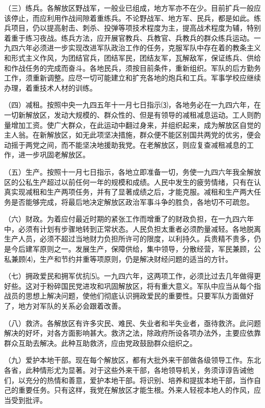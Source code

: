 \documentclass[UTF-8, a5paper, 12pt]{ctexart}
\begin{document}
（三）练兵。各解放区野战军，一般业已组成，地方军亦不在少。目前扩兵一般应该停止，而应利用作战间隙着重练兵。不论野战军、地方军、民兵，都是如此。练兵项目，仍以提高射击、刺杀、投弹等项技术程度为主，提高战术程度为辅，特别着重于练习夜战。练兵方法，应开展官教兵、兵教官、兵教兵的群众练兵运动。一九四六年必须进一步实现改进军队政治工作的任务，克服军队中存在着的教条主义和形式主义作风，为团结官兵，团结军民，团结友军，瓦解敌军，保证练兵、供给和作战任务的完成而奋斗。各地民兵，须按目前条件，重新组织。军队的后方勤务工作，须重新调整。应尽一切可能建立和扩充各地的炮兵和工兵。军事学校应继续办理，着重技术人材的训练。

（四）减租。按照中央一九四五年十一月七日指示⑶，各地务必在一九四六年，在一切新解放区，发动大规模的、群众性的、但是有领导的减租减息运动。工人则酌量增加工资。使广大群众，在此运动中翻过身来，并组织起来，成为解放区自觉的主人翁。在新解放区，如无此项坚决措施，群众便不能区别国共两党的优劣，便会动摇于两党之间，而不能坚决地援助我党。在老解放区，则应复查减租减息的工作，进一步巩固老解放区。

（五）生产。按照十一月七日指示，各地立即准备一切，务使一九四六年我全解放区的公私生产超过以前任何一年的规模和成绩。人民中发生的疲劳情绪，只有在认真实现减租和生产两项任务，并有了显著成绩之后，才能克服。减租和生产两大任务是否能够完成，将最后地决定解放区政治军事斗争的胜负，各地切不可疏忽。

（六）财政。为着应付最近时期的紧张工作而增重了的财政负担，在一九四六年中，必须有计划有步骤地转到正常状态。人民负担太重者必须酌量减轻。各地脱离生产人员，必须不超过当地财力负担所许可的限度，以利持久。兵贵精不贵多，仍是今后建军原则之一。发展生产，保障供给，集中领导，分散经营，军民兼顾，公私兼顾⑷，生产和节约并重等项原则，仍是解决财经问题的适当的方针。

（七）拥政爱民和拥军优抗⑸。一九四六年，这两项工作，必须比过去几年做得更好些。这对于粉碎国民党进攻和巩固解放区，将有重大意义。军队中应当从每个指战员的思想上解决问题，使他们彻底认识拥政爱民的重要性。只要军队方面做好了，地方对军队的关系必会跟着改善。

（八）救济。各解放区有许多灾民、难民、失业者和半失业者，亟待救济。此问题解决的好坏，对各方面影响甚大。救济之法，除政府所设各项办法外，主要应依靠群众互助去解决。此种互助救济，应由党政鼓励群众组织之。

（九）爱护本地干部。现在每个解放区，都有大批外来干部做各级领导工作。东北各省，此种情形尤为显著。对于这些外来干部，各地领导机关，务须谆谆告诫他们，以充分的热情和善意，爱护本地干部。将识别、培养和提拔本地干部，当作自己的重要任务。只有这样，我党在解放区才能生根。外来人轻视本地人的作风，应当受到批评。
\end{document}
